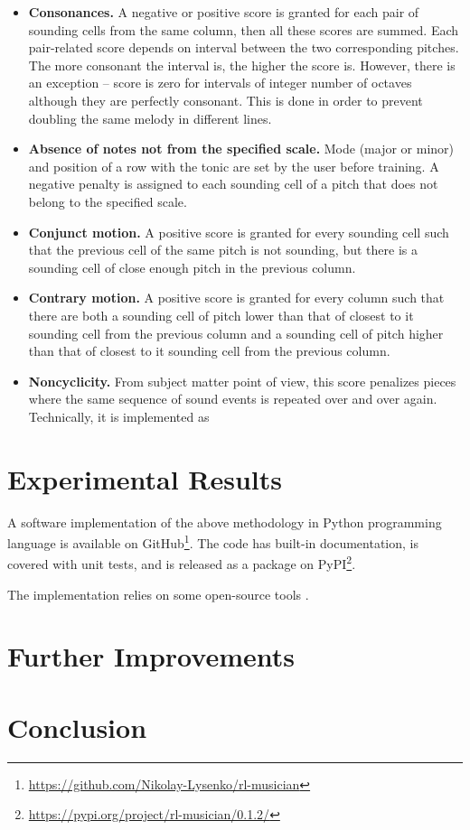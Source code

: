\documentclass{article}
\begin{document}
\begin{itemize}
	\item \textbf{Consonances.} A negative or positive score is granted for each pair of sounding cells from the same column, then all these scores are summed. Each pair-related score depends on interval between the two corresponding pitches. The more consonant the interval is, the higher the score is. However, there is an exception -- score is zero for intervals of integer number of octaves although they are perfectly consonant. This is done in order to prevent doubling the same melody in different lines.
	\item \textbf{Absence of notes not from the specified scale.} Mode (major or minor) and position of a row with the tonic are set by the user before training. A negative penalty is assigned to each sounding cell of a pitch that does not belong to the specified scale.
	\item \textbf{Conjunct motion.} A positive score is granted for every sounding cell such that the previous cell of the same pitch is not sounding, but there is a sounding cell of close enough pitch in the previous column.
	\item \textbf{Contrary motion.} A positive score is granted for every column such that there are both a sounding cell of pitch lower than that of closest to it sounding cell from the previous column and a sounding cell of pitch higher than that of closest to it sounding cell from the previous column.
    \item \textbf{Noncyclicity.} From subject matter point of view, this score penalizes pieces where the same sequence of sound events is repeated over and over again. Technically, it is implemented as  
\end{itemize}


\section{Experimental Results}
\label{sec:results}

A software implementation of the above methodology in Python programming language is available on GitHub\footnote{\url{https://github.com/Nikolay-Lysenko/rl-musician}}. The code has built-in documentation, is covered with unit tests, and is released as a package on PyPI\footnote{\url{https://pypi.org/project/rl-musician/0.1.2/}}.

The implementation relies on some open-source tools \cite{brockman2016openai,chollet2015keras,oliphant2006guide,raffel2014intuitive,dong2018pypianoroll}.


\section{Further Improvements}
\label{sec:improvements}


\section{Conclusion}
\label{sec:conclusion}


  

\end{document}
